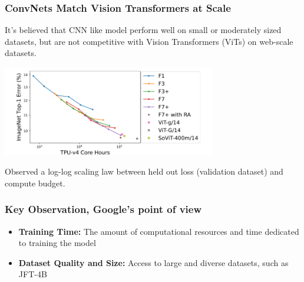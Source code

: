 \begin{frame}
\frametitle{ConvNets Match Vision Transformers at Scale}
It's believed that CNN like model perform well on small or moderately sized datasets, but are not competitive with Vision Transformers (ViTs) on web-scale datasets. 

\vspace{0.5 cm}

\begin{center}
    \includegraphics[width=0.7\textwidth]{img/3-section/log-log.png} 
\end{center}

Observed a log-log scaling law between held out loss (validation dataset) and compute budget.
\end{frame}

\begin{frame}
\frametitle{Key Observation, Google's point of view}

\vspace{0.5cm}
\begin{itemize}
    \item \textbf{Training Time:} The amount of computational resources and time dedicated to training the model
    \item \textbf{Dataset Quality and Size:} Access to large and diverse datasets, such as JFT-4B
\end{itemize}

\end{frame}


